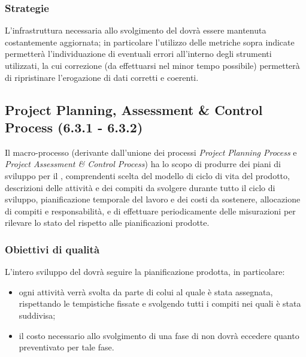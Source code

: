 \subsubsection{Strategie}
L'infrastruttura necessaria allo svolgimento del  dovrà essere mantenuta costantemente aggiornata; in particolare l'utilizzo delle metriche sopra indicate permetterà l'individuazione di eventuali errori all'interno degli strumenti utilizzati, la cui correzione (da effettuarsi nel minor tempo possibile) permetterà di ripristinare l'erogazione di dati corretti e coerenti.
\subsection{Project Planning, Assessment \& Control Process (6.3.1 - 6.3.2)}
\label{projPlanAssControl}
Il macro-processo (derivante dall'unione dei processi \textit{Project Planning Process} e \textit{Project Assessment \& Control Process}) ha lo scopo di produrre dei piani di sviluppo per il , comprendenti scelta del modello di ciclo di vita  del prodotto, descrizioni delle attività e dei compiti da svolgere durante tutto il ciclo di sviluppo, pianificazione temporale del lavoro e dei costi da sostenere, allocazione di compiti e responsabilità, e di effettuare periodicamente delle misurazioni per rilevare lo stato del  rispetto alle pianificazioni prodotte.
\subsubsection{Obiettivi di qualità}
L'intero sviluppo del  dovrà seguire la pianificazione prodotta, in particolare:
\begin{itemize}
\item ogni attività verrà svolta da parte di colui al quale è stata assegnata, rispettando le tempistiche fissate e svolgendo tutti i compiti nei quali è stata suddivisa;
\item il costo necessario allo svolgimento di una fase di  non dovrà eccedere quanto preventivato per tale fase.
\end{itemize}
